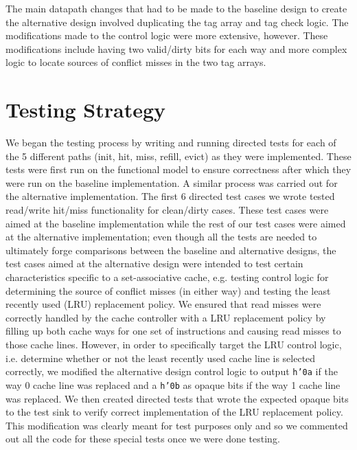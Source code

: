 \documentclass[10pt]{article}
\begin{document}
The main datapath changes that had to be made to the baseline design to create the alternative design involved duplicating the tag array and tag check logic. The modifications made to the control logic were more extensive, however. These modifications include having two valid/dirty bits for each way and more complex logic to locate sources of conflict misses in the two tag arrays.  \\





\section{Testing Strategy}

We began the testing process by writing and running directed tests for each of the 5 different paths (init, hit, miss, refill, evict) as they were implemented. These tests were first run on the functional model to ensure correctness after which they were run on the baseline implementation. A similar process was carried out for the alternative implementation. The first 6 directed test cases we wrote tested read/write hit/miss functionality for clean/dirty cases. These test cases were aimed at the baseline implementation while the rest of our test cases were aimed at the alternative implementation; even though all the tests are needed to ultimately forge comparisons between the baseline and alternative designs, the test cases aimed at the alternative design were intended to test certain characteristics specific to a set-associative cache, e.g. testing control logic for determining the source of conflict misses (in either way) and testing the least recently used (LRU) replacement policy. We ensured that read misses were correctly handled by the cache controller with a LRU replacement policy by filling up both cache ways for one set of instructions and causing read misses to those cache lines. However, in order to specifically target the LRU control logic, i.e. determine whether or not the least recently used cache line is selected correctly, we modified the alternative design control logic to output \texttt{h'0a} if the way 0 cache line was replaced and a \texttt{h'0b} as opaque bits if the way 1 cache line was replaced. We then created directed tests that wrote the expected opaque bits to the test sink to verify correct implementation of the LRU replacement policy. This modification was clearly meant for test purposes only and so we commented out all the code for these special tests once we were done testing. 
\end{document}
